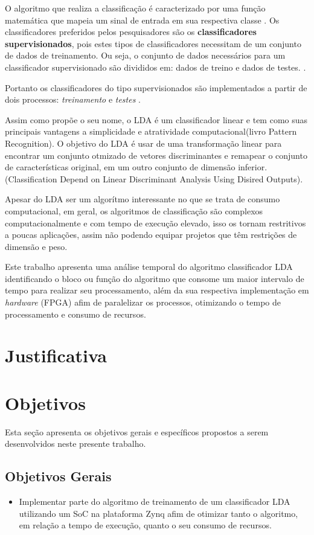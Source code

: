 O algoritmo que realiza a classificação é caracterizado por uma função matemática que mapeia um sinal de entrada em sua respectiva classe \cite{lottephd}. Os classificadores preferidos pelos pesquisadores são os \textbf{classificadores supervisionados}, pois estes tipos de classificadores necessitam de um conjunto de dados de treinamento. Ou seja, o conjunto de dados necessários para um classificador supervisionado são divididos em: dados de treino e dados de testes. \cite{Siulybook}.

Portanto os classificadores do tipo supervisionados são implementados a partir de dois processos: \textit{treinamento} e \textit{testes} \cite{Siulybook}.

Assim como propõe o seu nome, o LDA é um classificador linear e tem como suas principais vantagens a simplicidade e atratividade computacional(livro Pattern Recognition).
O objetivo do LDA é usar de uma transformação linear para encontrar um conjunto otmizado de vetores discriminantes e remapear o conjunto de características
original, em um outro conjunto de dimensão  inferior.(Classification Depend on Linear Discriminant Analysis Using Disired Outputs).

Apesar do LDA ser um algorítmo interessante no que se trata de consumo computacional, em geral, os algoritmos de classificação são complexos computacionalmente 
e com tempo de execução elevado, isso os tornam restritivos a poucas aplicações, assim não podendo equipar projetos que têm restrições de dimensão e peso.

Este trabalho apresenta uma análise temporal do algoritmo classificador LDA identificando o bloco ou função do algoritmo 
que consome um maior intervalo de tempo para realizar seu processamento, além da sua respectiva implementação em \textit{hardware}
(FPGA) afim de paralelizar os processos, otimizando o tempo de processamento e consumo de recursos.

\section{Justificativa}

\section{Objetivos}
Esta seção apresenta os objetivos gerais e específicos propostos a serem desenvolvidos neste presente trabalho.
\subsection{Objetivos Gerais}
\begin{itemize}
	\item Implementar parte do algoritmo de treinamento de um classificador LDA utilizando um SoC na plataforma Zynq afim de otimizar tanto o algoritmo, em relação a tempo de execução, quanto o seu consumo de recursos.
\end{itemize} 
